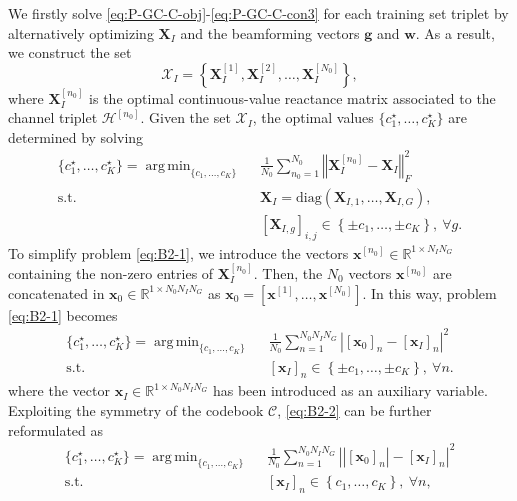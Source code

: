 \documentclass[twocolumn,10pt]{IEEEtran}
\DeclareMathOperator*{\argmin}{arg\,min}
\begin{document}
We firstly solve \eqref{eq:P-GC-C-obj}-\eqref{eq:P-GC-C-con3} for each training set triplet by alternatively optimizing $\mathbf{X}_I$ and the beamforming vectors $\mathbf{g}$ and $\mathbf{w}$.
As a result, we construct the set
\begin{equation}
\mathcal{X}_I=\left\{\mathbf{X}_I^{\left[1\right]},\mathbf{X}_I^{\left[2\right]},\ldots,\mathbf{X}_I^{\left[N_0\right]}\right\},
\end{equation}
where $\mathbf{X}_I^{\left[n_0\right]}$ is the optimal continuous-value reactance matrix associated to the channel triplet $\mathcal{H}^{[n_0]}$.
Given the set $\mathcal{X}_I$, the optimal values $\{c_1^\star,\ldots,c_K^\star\}$ are determined by solving
\begin{align}
\{c_1^\star,\ldots,c_K^\star\}=\argmin_{\{c_1,\ldots,c_K\}}\;\;
& \frac{1}{N_0}\sum_{n_0=1}^{N_0}\left\Vert\mathbf{X}_I^{[n_0]}-\mathbf{X}_I\right\Vert_F^2\label{eq:B2-1}\\
\mathsf{\mathrm{s.t.}}\;\;\;
& \mathbf{X}_{I}=\mathrm{diag}\left(\mathbf{X}_{I,1},\ldots,\mathbf{X}_{I,G}\right),\\
& \left[\mathbf{X}_{I,g}\right]_{i,j}\in\left\{\pm c_1,\ldots,\pm c_K\right\},\:\forall g.
\end{align}
To simplify problem \eqref{eq:B2-1}, we introduce the vectors $\mathbf{x}^{[n_0]}\in\mathbb{R}^{1\times N_IN_G}$ containing the non-zero entries of $\mathbf{X}_I^{[n_0]}$.
Then, the $N_0$ vectors $\mathbf{x}^{[n_0]}$ are concatenated in $\mathbf{x}_0\in\mathbb{R}^{1\times N_0N_IN_G}$ as $\mathbf{x}_0=[\mathbf{x}^{[1]},\ldots,\mathbf{x}^{[N_0]}]$.
In this way, problem \eqref{eq:B2-1} becomes
\begin{align}
\{c_1^\star,\ldots,c_K^\star\}=\argmin_{\{c_1,\ldots,c_K\}}\;\;
& \frac{1}{N_0}\sum_{n=1}^{N_0N_IN_G}\left\vert\left[\mathbf{x}_0\right]_n-\left[\mathbf{x}_I\right]_n\right\vert^2\label{eq:B2-2}\\
\mathsf{\mathrm{s.t.}}\;\;\;
& \left[\mathbf{x}_I\right]_n\in\left\{\pm c_1,\ldots,\pm c_K\right\},\:\forall n.
\end{align}
where the vector $\mathbf{x}_I\in\mathbb{R}^{1\times N_0N_IN_G}$ has been introduced as an auxiliary variable.
Exploiting the symmetry of the codebook $\mathcal{C}$, \eqref{eq:B2-2} can be further reformulated as
\begin{align}
\{c_1^\star,\ldots,c_K^\star\}=\argmin_{\{c_1,\ldots,c_K\}}\;\;
& \frac{1}{N_0}\sum_{n=1}^{N_0N_IN_G}\left\vert\left\vert\left[\mathbf{x}_0\right]_n\right\vert-\left[\mathbf{x}_I\right]_n\right\vert^2\label{eq:B2-3}\\
\mathsf{\mathrm{s.t.}}\;\;\;
& \left[\mathbf{x}_I\right]_n\in\left\{c_1,\ldots,c_K\right\},\:\forall n,
\end{align}
\end{document}
